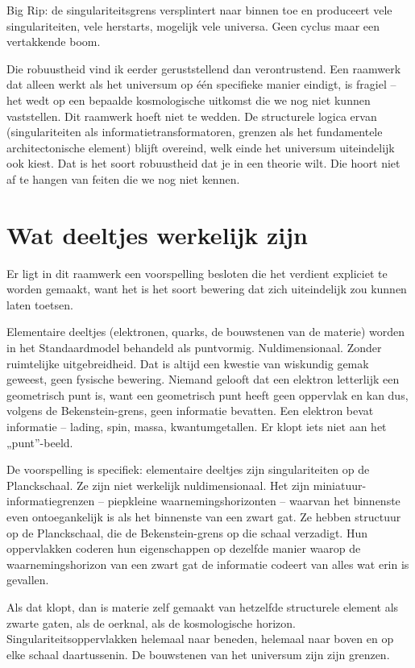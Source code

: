 \documentclass[11pt, twoside, openright]{book}
\begin{document}
Big Rip: de singulariteitsgrens versplintert naar binnen toe en produceert vele singulariteiten, vele herstarts, mogelijk vele universa. Geen cyclus maar een vertakkende boom.

Die robuustheid vind ik eerder geruststellend dan verontrustend. Een raamwerk dat alleen werkt als het universum op één specifieke manier eindigt, is fragiel -- het wedt op een bepaalde kosmologische uitkomst die we nog niet kunnen vaststellen. Dit raamwerk hoeft niet te wedden. De structurele logica ervan (singulariteiten als informatietransformatoren, grenzen als het fundamentele architectonische element) blijft overeind, welk einde het universum uiteindelijk ook kiest. Dat is het soort robuustheid dat je in een theorie wilt. Die hoort niet af te hangen van feiten die we nog niet kennen.


\section*{Wat deeltjes werkelijk zijn}

Er ligt in dit raamwerk een voorspelling besloten die het verdient expliciet te worden gemaakt, want het is het soort bewering dat zich uiteindelijk zou kunnen laten toetsen.

Elementaire deeltjes (elektronen, quarks, de bouwstenen van de materie) worden in het Standaardmodel behandeld als puntvormig. Nuldimensionaal. Zonder ruimtelijke uitgebreidheid. Dat is altijd een kwestie van wiskundig gemak geweest, geen fysische bewering. Niemand gelooft dat een elektron letterlijk een geometrisch punt is, want een geometrisch punt heeft geen oppervlak en kan dus, volgens de Bekenstein-grens, geen informatie bevatten. Een elektron bevat informatie -- lading, spin, massa, kwantumgetallen. Er klopt iets niet aan het „punt”-beeld.

De voorspelling is specifiek: elementaire deeltjes zijn singulariteiten op de Planckschaal. Ze zijn niet werkelijk nuldimensionaal. Het zijn miniatuur-informatiegrenzen -- piepkleine waarnemingshorizonten -- waarvan het binnenste even ontoegankelijk is als het binnenste van een zwart gat. Ze hebben structuur op de Planckschaal, die de Bekenstein-grens op die schaal verzadigt. Hun oppervlakken coderen hun eigenschappen op dezelfde manier waarop de waarnemingshorizon van een zwart gat de informatie codeert van alles wat erin is gevallen.

Als dat klopt, dan is materie zelf gemaakt van hetzelfde structurele element als zwarte gaten, als de oerknal, als de kosmologische horizon. Singulariteitsoppervlakken helemaal naar beneden, helemaal naar boven en op elke schaal daartussenin. De bouwstenen van het universum zijn zijn grenzen.
\end{document}
